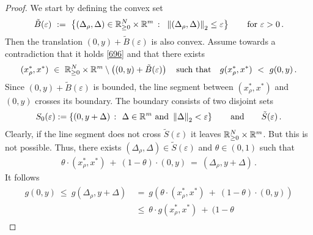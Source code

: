 \begin{proof}
  We start by defining the convex set
  \begin{gather*}
    \tilde{B}(\varepsilon)
    \ 
    :=
    \ 
    \left\{ 
      (\Delta_\rho,\Delta)
      \in
      \R^N_{\ge 0}\times\R^m
      \ 
      \colon
      \ 
      \norm{
      (\Delta_\rho,\Delta)
      }_2
      \le
      \varepsilon
    \right\}
    \qquad
    \text{for}
    \ 
    \varepsilon>0
    \,.
  \end{gather*}
  Then the translation 
  $
  (0,y)
  +
    \tilde{B}(\varepsilon)
  $
  is also convex.
  Assume towards a contradiction that it holds \eqref{696}
  and that there exists 
  \begin{gather}
    \label{698}
  (x^*_\rho,x^*)
  \ 
\in
  \ 
\R^N_{\ge 0}\times\R^m\setminus 
\left(
  (0,y)
  +
    \tilde{B}(\varepsilon)
\right)
\quad
\text{such that}\quad
g
  (x^*_\rho,x^*)
  \ 
  <
  \ 
  g(0,y)
  \,.
  \end{gather}
  Since 
  $
  (0,y)
  +
    \tilde{B}(\varepsilon)
  $
  is bounded, the line segment between 
  $
  (x^*_\rho,x^*)
  $
  and
  $
  (0,y)
  $
  crosses its boundary. The boundary consists of two disjoint sets
  \begin{gather*}
    S_0(\varepsilon)
    :=
    \left\{ 
      (0,y+\Delta)
      \ 
      \colon
      \ 
      \Delta\in\R^m\ 
      \text{and}\ 
      \norm{\Delta}_2<\varepsilon
    \right\}
    \qquad
    \text{and}
    \qquad
    \tilde{S}(\varepsilon)
    \,.
  \end{gather*}
  Clearly, if the line segment does not cross $\tilde{S}(\varepsilon)$ it leaves $\mathbb{R}^N_{\ge 0}\times\mathbb{R}^m$.
  But this is not possible.
  Thus, there exists $(\Delta_\rho,\Delta)\in \tilde{S}(\varepsilon)$ and $\theta\in(0,1)$ such that 
  \begin{gather}
    \label{697}
    \theta 
    \cdot
  (x^*_\rho,x^*)
  \ 
  +
  \ 
  (
  1
  -
\theta
  )
  \cdot
  (0,y)
  \ 
  =
  \ 
  (\Delta_\rho,y+\Delta)
  \,.
  \end{gather}
  It follows
 \begin{align*}
      \begin{split}
      g(0,y)
      \ 
      \le
      \ 
      g
  (\Delta_\rho,y+\Delta)
&
      \ 
      =
      \ 
      g
      \left( 
    \theta 
    \cdot
  (x^*_\rho,x^*)
  \ 
  +
  \ 
  (
  1
  -
\theta
  )
  \cdot
  (0,y)
      \right)
      \\
&
      \ 
      \le
      \ 
    \theta 
    \cdot
      g
  (x^*_\rho,x^*)
  \ 
  +
  \ 
  (
  1
  -
\theta

\end{split}
\end{align*}
\end{proof}
